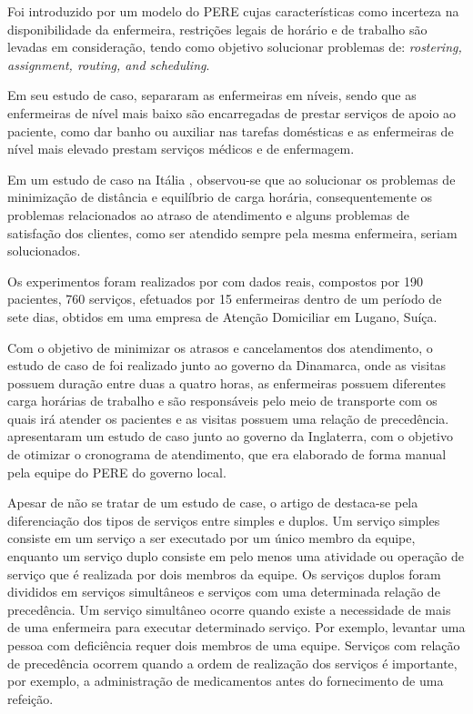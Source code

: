 Foi introduzido por  um modelo do \ac{PERE} cujas características como incerteza na disponibilidade da enfermeira, restrições legais de horário e de trabalho são levadas em consideração, tendo como objetivo solucionar problemas de: \textit{rostering, assignment, routing, and scheduling}.

Em seu estudo de caso,  separaram as enfermeiras em níveis, sendo que as enfermeiras de nível mais baixo são encarregadas de prestar serviços de apoio ao paciente, como dar banho ou auxiliar nas tarefas domésticas e as enfermeiras de nível mais elevado prestam serviços médicos e de enfermagem.

Em um estudo de caso na Itália , observou-se que ao solucionar os problemas de minimização de distância e equilíbrio de carga horária, consequentemente os problemas relacionados ao atraso de atendimento e alguns problemas de satisfação dos clientes, como ser atendido sempre pela mesma enfermeira, seriam solucionados.

Os experimentos foram realizados por  com dados reais, compostos por 190 pacientes, 760 serviços, efetuados por 15 enfermeiras dentro de um período de sete dias, obtidos em uma empresa de Atenção Domiciliar em Lugano, Suíça.

Com o objetivo de minimizar os atrasos e cancelamentos dos atendimento, o estudo de caso de  foi realizado junto ao governo da Dinamarca, onde as visitas possuem duração entre duas a quatro horas, as enfermeiras possuem diferentes carga horárias de trabalho e são responsáveis pelo meio de transporte com os quais irá atender os pacientes e as visitas possuem uma relação de precedência.  apresentaram um estudo de caso junto ao governo da Inglaterra, com o objetivo de otimizar o cronograma de atendimento, que era elaborado de forma manual pela equipe do \ac{PERE} do governo local.

Apesar de não se tratar de um estudo de case, o artigo de  destaca-se pela diferenciação dos tipos de serviços entre simples e duplos. 
Um serviço simples consiste em um serviço a ser executado por um único membro da equipe, enquanto um serviço duplo consiste em pelo menos uma atividade ou operação de serviço que é realizada por dois membros da equipe. 
Os serviços duplos foram divididos em serviços simultâneos e serviços com uma determinada relação de precedência.  
Um serviço simultâneo ocorre quando existe a necessidade de mais de uma enfermeira para executar determinado serviço. Por exemplo, levantar uma pessoa com deficiência requer dois membros de uma equipe. 
Serviços com relação de precedência ocorrem quando a ordem de realização dos serviços é importante, por exemplo, a administração de medicamentos antes do fornecimento de uma refeição.

